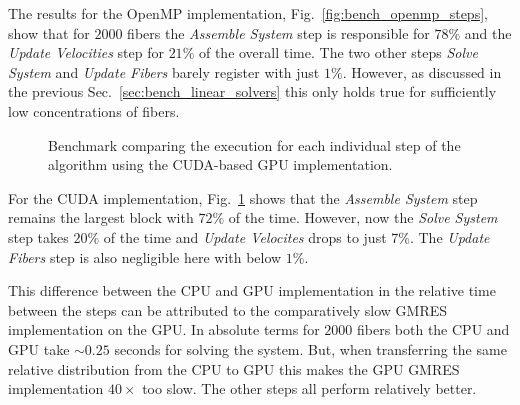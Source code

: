 The results for the OpenMP implementation, Fig.~\ref{fig:bench_openmp_steps}, show that for $2000$ fibers the \emph{Assemble System} step is responsible for $78\%$ and the \emph{Update Velocities} step for $21\%$ of the overall time. The two other steps \emph{Solve System} and \emph{Update Fibers} barely register with just $1\%$. However, as discussed in the previous Sec.~\ref{sec:bench_linear_solvers} this only holds true for sufficiently low concentrations of fibers.

\begin{figure}[!htbp]
  \centering
  \caption[Benchmark individual steps on GPU.]{Benchmark comparing the execution for each individual step of the algorithm using the CUDA-based GPU implementation.}
  \label{fig:bench_cuda_steps}
\end{figure}

For the CUDA implementation, Fig.~\ref{fig:bench_cuda_steps} shows that the \emph{Assemble System} step remains the largest block with $72\%$ of the time. However, now the \emph{Solve System} step takes $20\%$ of the time and \emph{Update Velocites} drops to just $7\%$. The \emph{Update Fibers} step is also negligible here with below $1\%$.

This difference between the CPU and GPU implementation in the relative time between the steps can be attributed to the comparatively slow GMRES implementation on the GPU. In absolute terms for $2000$ fibers both the CPU and GPU take ${\sim}0.25$ seconds for solving the system. But, when transferring the same relative distribution from the CPU to GPU this makes the GPU GMRES implementation $40×$ too slow. The other steps all perform relatively better.

